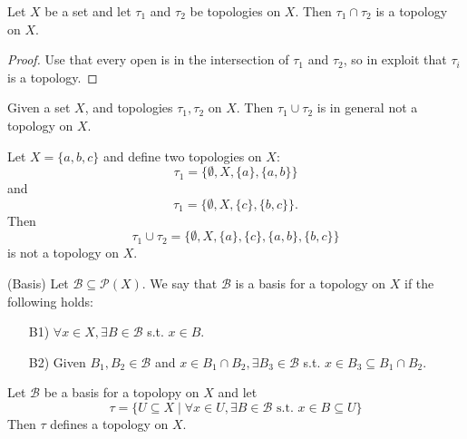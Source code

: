 \begin{proposition}
  Let \( X \) be a set and let \( \tau_1 \) and \( \tau_2 \)
  be topologies on \( X \). Then \( \tau_1 \cap \tau_2 \) is
  a topology on \( X \).
\end{proposition}

\begin{proof}
  Use that every open is in the intersection of \( \tau_1 \) and \( \tau_2 \),
  so in exploit that \( \tau_i \) is a topology.
\end{proof}

Given a set \( X \), and topologies \( \tau_1, \tau_2 \) on \( X \).
Then \( \tau_1 \cup \tau_2 \) is in general not a topology on \( X \).

\begin{nonexample}
  Let \( X = \{ a, b, c  \}  \) and define two topologies on \( X \):
  \[
    \tau_1 = \{ \emptyset, X, \{ a \}, \{ a, b \} \}
  \]
  and 
  \[
    \tau_1 = \{ \emptyset, X, \{ c \}, \{ b, c \} \}.
  \]
  Then
  \[
    \tau_1 \cup \tau_2 = \{ \emptyset, X, \{ a \}, \{ c \}, \{ a, b \}, \{ b, c \} \}
  \]
  is not a topology on \( X \).
\end{nonexample}

\begin{definition}{(Basis)}
  Let \( \mathscr{B} \subseteq \mathcal{P}(X) \).
  We say that \( \mathscr{B} \) is a basis
  for a topology on \( X \) if the following
  holds:

  \begin{enumerate}
    \item[B1)] \( \forall x \in X, \exists B \in \mathscr{B} \)
      s.t. \( x \in B \).
    \item[B2)] Given \( B_1, B_2 \in \mathscr{B} \) and \( x \in B_1 \cap B_2,
      \exists B_3 \in \mathscr{B} \) s.t. \( x \in B_3 \subseteq B_1 \cap B_2 \).
  \end{enumerate}
   
\end{definition}

\begin{proposition}
  Let \( \mathscr{B} \) be a basis for a topolopy on \( X \)
  and let
  \[
    \tau = \{U \subseteq X \mid \forall x \in U, \exists B \in \mathscr{B} \text{ s.t. } x \in B \subseteq U \}
  \]
  Then \( \tau \) defines a topology on \( X \).
\end{proposition}

